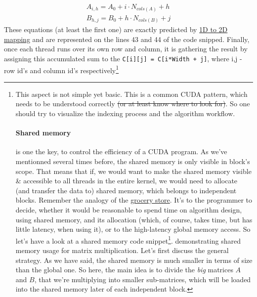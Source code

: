 \vspace{-0.9cm}
\begin{gather*}
 A_{i, h} = A_{0} + i\cdot N_{cols(A)} + h
\\
B_{h,j} = B_{0} + h \cdot N_{cols(B)} + j
\end{gather*}
These equations (at least the first one) are exactly predicted by \hyperref[intermezzo1d2d]{1D to 2D mapping} and
are represented on the lines 43 and 44 of the code snipped. 
Finally, once each thread runs over its own row and column, it is 
gathering the result by assigning this accumulated sum to the 
\verb|C[i][j] = C[i*Width + j]|, where i,j - row id's and column id's respectively\footnote{This 
aspect is not simple yet basic. This is a common CUDA pattern, which needs to be understood correctly 
\sout{(or at least know where to look for)}. So one should try to visualize the indexing process and the algorithm workflow. 


\paragraph*{Shared memory} is one the key, to control the efficiency of a CUDA program. 
As we've mentionned several times before, the shared memory is only visible in block's scope. That means that 
if, we would want to make the shared memory visible \& accessible to all threads in the entire kernel, we would 
need to allocate (and transfer the data to) shared memory, which belongs to independent blocks. 
Remember the analogy of the \hyperref[grocery_store]{grocery store}.
It's to the programmer to decide, whether it would be reasonable to spend time on algorithm design, using shared memory, and its allocation
 (which, of course, takes time, but has little latency, when using it), or to the high-latency global memory access.
So let's have a look at a shared memory code snippet\footnote{For space-saving's sake, only a snipped is provided. The skipped pieces are usual steps of 
memory allocation, freeing resources, etc...}.
demonstrating shared memory usage for matrix multiplication. 
Let's first discuss the general strategy. As we have said, the shared memory is much smaller in terms of size 
than the global one. So here, the main idea is to divide the \textit{big} matrices $A$ and $B$, that we're multiplying into smaller
sub-matrices, which will be loaded into the shared memory later of each independent block.

}
